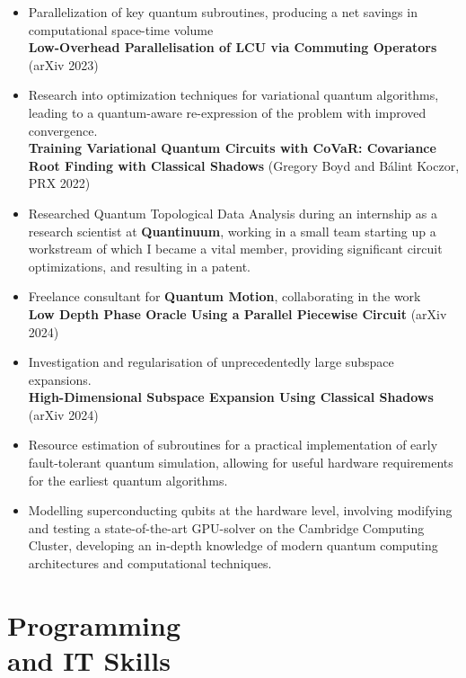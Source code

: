 \documentclass[margin, 10pt]{res} %
\begin{document}
\begin{resume}
\begin{itemize}
    \item Parallelization of key quantum subroutines, producing a net
    savings in computational space-time volume \\
    \textbf{Low-Overhead Parallelisation of LCU via Commuting
    Operators} \\ (arXiv 2023)
    \item Research into optimization techniques for variational quantum
    algorithms, leading to a quantum-aware re-expression of the
    problem with improved convergence. \\
    \textbf{Training Variational Quantum Circuits with CoVaR:
    Covariance Root Finding with Classical Shadows}
    (Gregory Boyd and Bálint Koczor, PRX 2022)
    \item Researched Quantum Topological Data Analysis during an
    internship as a research scientist at \textbf{Quantinuum}, working in a
    small team starting up a workstream of which I became a vital
    member, providing significant circuit optimizations, and resulting in a patent.
    \item Freelance consultant for \textbf{Quantum Motion}, collaborating in the work \\
    \textbf{Low Depth Phase Oracle Using a Parallel Piecewise Circuit} (arXiv 2024)
    \item Investigation and regularisation of unprecedentedly large subspace expansions. \\
    \textbf{High-Dimensional Subspace Expansion Using Classical Shadows} (arXiv 2024)

    \item Resource estimation of subroutines for a practical
    implementation of early fault-tolerant quantum simulation,
    allowing for useful hardware requirements for the earliest
    quantum algorithms.
    \item Modelling superconducting qubits at the hardware level, involving
    modifying and testing a state-of-the-art GPU-solver on
    the Cambridge Computing Cluster, developing an in-depth
    knowledge of modern quantum computing architectures and
    computational techniques.
\end{itemize}

\section{Programming \\and IT Skills}


\end{resume}
\end{document}
